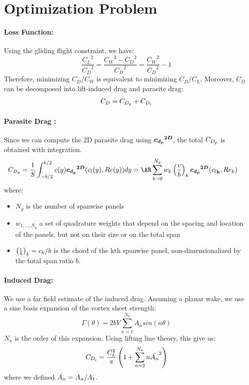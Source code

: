 \documentclass[letterpaper,12pt]{article}
\begin{document}
\section{Optimization Problem}

\paragraph{Loss Function:}Using the gliding flight constraint, we have:
$$ \frac{{C_L}^2}{{C_D}^2} = \frac{{C_W}^2 - {C_D}^2}{{C_D}^2} = \frac{{C_W}^2}{{C_D}^2} - 1$$
Therefore, minimizing $C_{D} / C_W$  is equivalent to minimizing $C_{D} / C_L$.
Moreover, $C_D$ can be decomposed into lift-induced drag and parasite drag:
$$C_D = C_{D_p} + C_{D_i}$$

\paragraph{Parasite Drag :}Since we can compute the 2D parasite drag using $\boldsymbol{{c_{d_p}}^{2D}}$, the total $C_{D_p}$ is obtained with integration.
\begin{align*}
	\CDp &= \frac 1 S \int_{-b/2}^{b/2} c(y) \cddat(c_l(y), Re(y)) dy = \AR \sum_{k=0}^{N_y} w_k \cb{k} \cddat(\cl{k}, Re_k)
\end{align*}
where:
\begin{itemize}
	\item $N_y$ is the number of spanwise panels
	\item $w_{1,\dots, N_y}$ a set of quadrature weights that depend on the spacing and location of the panels, but not on their size or on the total span
	\item $\left( \frac c b \right)_{k} = c_k / b$ is the chord of the kth spanwise panel,  non-dimensionalized by the total span ratio $b$.
\end{itemize} 

\paragraph{Induced Drag:}We use a far field estimate of the induced drag. 
Assuming a planar wake, we use a sine basis expansion of the vortex sheet strength:
$$\Gamma(\theta) = 2bV \sum_{n=1}^{N_a} A_n sin(n \theta)$$
$N_a$ is the order of this expansion.
Using lifting line theory, this give us:
$$C_{D_i} = \frac{C_L^2}{\pi } \left(1+\sum_{n=2}^{N_a} n \bar{A_{n}}^2\right) $$
where we defined $\bar{A_{n}} = A_n/A_1$.
\end{document}
